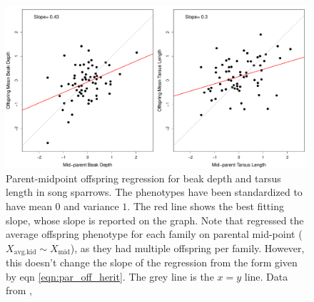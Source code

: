 \begin{figure}
\begin{center}
\includegraphics[width=\textwidth]{Journal_figs/Quant_gen/song_sparrow_herit/song_sparrow_herit.pdf}
\end{center}
\caption{Parent-midpoint offspring regression for beak depth and
  tarsus length in song sparrows.  The phenotypes have been standardized to have mean $0$  and variance $1$. The red line shows the best fitting
  slope, whose slope is reported on the graph.  Note that \citet{smith1979heritability}
regressed the average offspring phenotype
for each family on parental mid-point ($X_{\textrm{avg.kid}}\sim X_{\textrm{mid}}$), as they had multiple offspring per family. However, this doesn't change the slope of the
regression from the form given by eqn \eqref{eqn:par_off_herit}.  The grey line is the
  $x=y$ line. Data from \citet{smith1979heritability},
  } \label{fig:song_sparrow_herit}
\end{figure}

